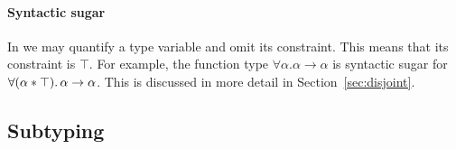 \paragraph{Syntactic sugar}
In \name we may quantify a type variable and omit its constraint. 
This means that its constraint is $\top$. 
For example, the function type $\forall \alpha. \alpha \to \alpha$ is syntactic sugar
for  $\forall (\alpha * \top).\, \alpha \to \alpha$.
This is discussed in more detail in Section~\ref{sec:disjoint}. 


\subsection{Subtyping}


%
%
%

